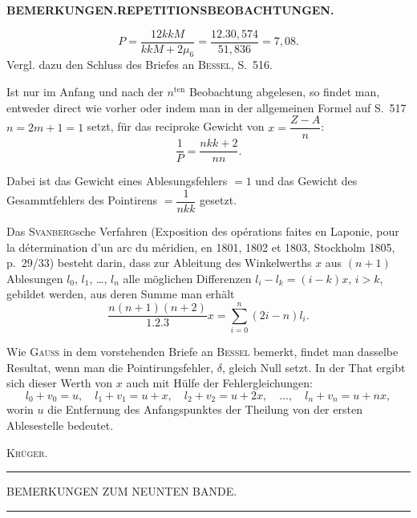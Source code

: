 \par\clearpage
\noindent{}\hfill{\small\textbf{BEMERKUNGEN.\quad REPETITIONSBEOBACHTUNGEN.}}\hfill\null\par\medskip
\[
 P=\frac{12kkM}{kkM+2\mu_6}=\frac{12.30{,}574}{51{,}836}=7{,}08.
\]
\indent Vergl. dazu den Schluss des Briefes an \textsc{Bessel}, S.~516.

Ist nur im Anfang und nach der $n^{\text{ten}}$ Beobachtung abgelesen, so findet man, entweder direct wie vorher oder indem man in der allgemeinen Formel auf S.~517 $n=2m+1=1$ setzt, für das reciproke Gewicht von $x=\dfrac{Z-A}{n}$:
\[
 \frac{1}{P}=\frac{nkk+2}{nn}.
\]

Dabei ist das Gewicht eines Ablesungsfehlers $=1$ und das Gewicht des Gesammtfehlers des Pointirens $=\dfrac{1}{nkk}$ gesetzt.

Das \textsc{Svanberg}sche Verfahren (Exposition des opérations faites en Laponie, pour la détermination d'un arc du méridien, en 1801, 1802 et 1803, Stockholm 1805, p.~29/33) besteht darin, dass zur Ableitung des Winkelwerths $x$ aus $(n+1)$ Ablesungen $l_0$, $l_1$, \ldots, $l_n$ alle möglichen Differenzen $l_i-l_k=(i-k)x$, $i>k$, gebildet werden, aus deren Summe man erhält
\[
 \frac{n(n+1)(n+2)}{1.2.3}x=\sum_{i=0}^{n}(2i-n)l_i.
\]

Wie \textsc{Gauss} in dem vorstehenden Briefe an \textsc{Bessel} bemerkt, findet man dasselbe Resultat, wenn man die Pointirungsfehler, $\delta$, gleich Null setzt. In der That ergibt sich dieser Werth von $x$ auch mit Hülfe der Fehlergleichungen:
\[
 l_0+v_0=u,\quad l_1+v_1=u+x,\quad l_2+v_2=u+2x,\quad \ldots,\quad l_n+v_n=u+nx,
\]
worin $u$ die Entfernung des Anfangspunktes der Theilung von der ersten Ablesestelle bedeutet.\par
\hfill\textsc{Krüger.}\hspace*{\parindent}\par

\vspace{2.5cm}
\begin{center}\rule{4cm}{.4pt}\end{center}

\par\clearpage
\vspace*{.11\textheight}
\begin{center}
 {\Large BEMERKUNGEN ZUM NEUNTEN BANDE.}\par
 \vspace{1em}
 \rule{1.5cm}{.4pt}
\end{center}
\vspace{1em}

